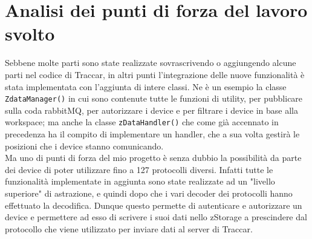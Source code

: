 \documentclass[a4paper,titlepage,12pt]{report}
\begin{document}
{\section{
Analisi dei punti di forza del lavoro svolto}
Sebbene molte parti sono state realizzate sovrascrivendo o aggiungendo alcune parti nel codice di Traccar, in altri punti  l'integrazione delle nuove funzionalità è stata implementata con l'aggiunta di intere classi. Ne è un esempio la classe \texttt{ZdataManager()} in cui sono contenute tutte le funzioni di utility, per pubblicare sulla coda rabbitMQ, per autorizzare i device e per filtrare i device in base alla workspace; ma anche la classe \texttt{zDataHandler()}  che come già accennato in precedenza ha il compito di implementare un handler, che a sua volta gestirà le posizioni che i device stanno comunicando.\\
Ma uno di punti di forza del mio progetto è senza dubbio la possibilità da parte dei device di poter utilizzare fino a 127 protocolli diversi. Infatti tutte le funzionalità implementate in aggiunta sono state realizzate ad un "livello superiore" di astrazione, e quindi dopo che i vari decoder dei protocolli hanno effettuato la decodifica. Dunque questo permette di autenticare e autorizzare un device e permettere ad esso di scrivere i suoi dati nello zStorage a prescindere dal protocollo che viene utilizzato per inviare dati al server di Traccar.

}
\end{document}
